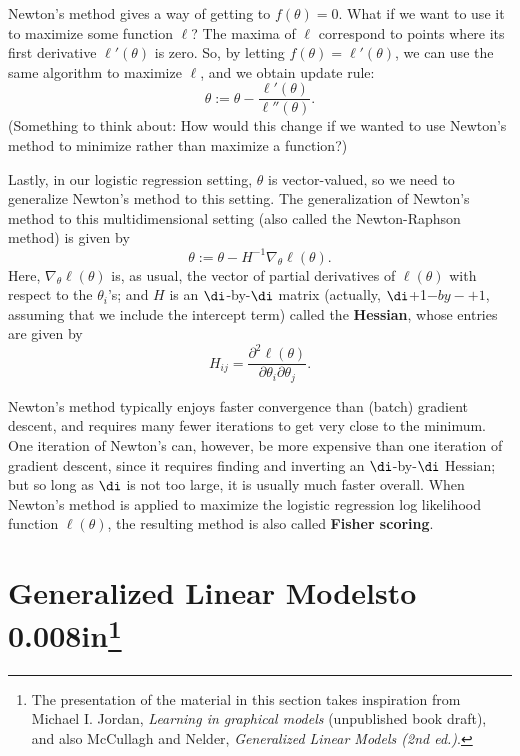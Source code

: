\documentclass{article}
\begin{document}
Newton's method gives a way of getting to $f(\theta)=0$.  What if we want
to use it to maximize some function $\ell$?  The maxima of $\ell$ correspond
to points where its first derivative $\ell'(\theta)$ is zero.  So, by letting
$f(\theta) = \ell'(\theta)$, we can use the same algorithm to maximize $\ell$,
and we obtain update rule:
\[
\theta := \theta - \frac{\ell'(\theta)}{\ell''(\theta)}.
\]
(Something to think about: How would this change if we wanted to
use Newton's method to minimize rather than maximize a function?)


Lastly, in our logistic regression setting, $\theta$ is vector-valued, so
we need to generalize Newton's method to this setting.  The generalization of
Newton's method to this multidimensional setting (also called the
Newton-Raphson method) is given by
\[
\theta := \theta - H^{-1} \nabla_\theta \ell(\theta).
\]
Here, $\nabla_\theta \ell(\theta)$ is, as usual, the vector of partial derivatives
of $\ell(\theta)$ with respect to the $\theta_i$'s; and $H$ is an $\di$-by-$\di$
matrix (actually, $\di$+1$-by-$\di$+1$, assuming that we include the intercept term)
called the {\bf Hessian}, whose entries are given by
\[
H_{ij} = \frac{\partial^2 \ell(\theta)}{\partial \theta_i \partial \theta_j}.
\]

Newton's method typically enjoys faster convergence than (batch) gradient
descent, and requires many fewer iterations to get very close to the
minimum.  One iteration of Newton's can, however, be more expensive than one
iteration of gradient descent, since it requires finding and
inverting an $\di$-by-$\di$ Hessian; but so long as $\di$ is not too large,
it is usually much faster overall.  When Newton's method is applied to maximize the
logistic regression log likelihood function $\ell(\theta)$, the resulting method
is also called {\bf Fisher scoring}.

\newpage
\part{Generalized Linear
  Models\hbox to 0.008in{}\protect\LARGE\protect\footnote{The presentation of the
material in this section takes inspiration from Michael I. Jordan, \emph{Learning
in graphical models} (unpublished book draft), and also McCullagh and Nelder,
\emph{Generalized Linear Models (2nd ed.)}.}
}
\end{document}
